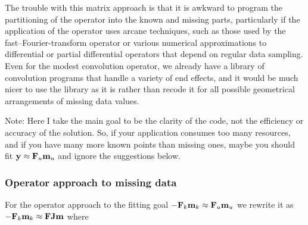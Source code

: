 \par
The trouble with this matrix approach is that it is awkward to program
the partitioning of the operator into the known and missing parts,
particularly if the application of the operator uses arcane techniques,
such as those used by the fast--Fourier-transform operator
or various numerical approximations to differential or partial
differential operators that depend on regular data sampling.
Even for the modest convolution operator,
we already have a library of convolution programs
that handle a variety of end effects,
and it would be much nicer to use the library as it is
rather than recode it for all possible geometrical arrangements
of missing data values.
\par
Note:
Here I take the main goal to be the clarity of the code,
not the efficiency or accuracy of the solution.
So, if your application consumes too many resources,
and if you have many more known points than missing ones,
maybe you should fit
$\bold y \approx \bold F_u \bold m_u$
and ignore the suggestions below.

\subsubsection{Operator approach to missing data}
\par
For the operator approach to the fitting goal
$ -\bold F_k \bold m_k \approx \bold F_u \bold m_u$
we rewrite it as
$ -\bold F_k \bold m_k \approx \bold F \bold J \bold m $ where

